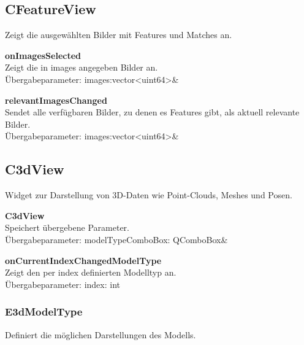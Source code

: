\subsection{CFeatureView}
Zeigt die ausgewählten Bilder mit Features und Matches an.
\beginMembers
{}
\closeMembers
\beginSlots
\item \textbf{onImagesSelected} \\Zeigt die in images angegeben Bilder an. \\Übergabeparameter: images:vector<uint64>\&
\closeMembers
\beginSignals
\item \textbf{relevantImagesChanged} \\ Sendet alle verfügbaren Bilder, zu denen es Features gibt, als aktuell relevante Bilder. \\Übergabeparameter: images:vector<uint64>\&
\closeMembers

\subsection{C3dView}
Widget zur Darstellung von 3D-Daten wie Point-Clouds, Meshes und Posen.
\beginMembers
\item \textbf{C3dView} \\ Speichert übergebene Parameter. \\Übergabeparameter: modelTypeComboBox: QComboBox\&
\closeMembers
\beginSlots
\item \textbf{onCurrentIndexChangedModelType} \\Zeigt den per index definierten Modelltyp an. \\Übergabeparameter: index: int
\closeMembers
\subsubsection{E3dModelType}
Definiert die möglichen Darstellungen des Modells.

